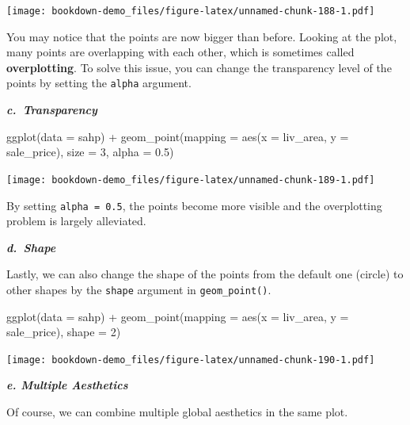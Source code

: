 \documentclass[
]{book}
\newenvironment{Shaded}{\begin{snugshade}}{\end{snugshade}}
\newcommand{\AttributeTok}[1]{\textcolor[rgb]{0.77,0.63,0.00}{#1}}
\newcommand{\DecValTok}[1]{\textcolor[rgb]{0.00,0.00,0.81}{#1}}
\newcommand{\FloatTok}[1]{\textcolor[rgb]{0.00,0.00,0.81}{#1}}
\newcommand{\FunctionTok}[1]{\textcolor[rgb]{0.00,0.00,0.00}{#1}}
\newcommand{\NormalTok}[1]{#1}
\newcommand{\SpecialCharTok}[1]{\textcolor[rgb]{0.00,0.00,0.00}{#1}}
\begin{document}
\texttt{[image: bookdown-demo\_files/figure-latex/unnamed-chunk-188-1.pdf]}

You may notice that the points are now bigger than before. Looking at the plot, many points are overlapping with each other, which is sometimes called \textbf{overplotting}. To solve this issue, you can change the transparency level of the points by setting the \texttt{alpha} argument.

\textbf{\emph{c.~Transparency}}

\begin{Shaded}
\begin{Highlighting}[]
\FunctionTok{ggplot}\NormalTok{(}\AttributeTok{data =}\NormalTok{ sahp) }\SpecialCharTok{+} \FunctionTok{geom\_point}\NormalTok{(}\AttributeTok{mapping =} \FunctionTok{aes}\NormalTok{(}\AttributeTok{x =}\NormalTok{ liv\_area, }\AttributeTok{y =}\NormalTok{ sale\_price), }\AttributeTok{size =} \DecValTok{3}\NormalTok{, }\AttributeTok{alpha =} \FloatTok{0.5}\NormalTok{)}
\end{Highlighting}
\end{Shaded}

\texttt{[image: bookdown-demo\_files/figure-latex/unnamed-chunk-189-1.pdf]}

By setting \texttt{alpha\ =\ 0.5}, the points become more visible and the overplotting problem is largely alleviated.

\textbf{\emph{d.~Shape}}

Lastly, we can also change the shape of the points from the default one (circle) to other shapes by the \texttt{shape} argument in \texttt{geom\_point()}.

\begin{Shaded}
\begin{Highlighting}[]
\FunctionTok{ggplot}\NormalTok{(}\AttributeTok{data =}\NormalTok{ sahp) }\SpecialCharTok{+} \FunctionTok{geom\_point}\NormalTok{(}\AttributeTok{mapping =} \FunctionTok{aes}\NormalTok{(}\AttributeTok{x =}\NormalTok{ liv\_area, }\AttributeTok{y =}\NormalTok{ sale\_price), }\AttributeTok{shape =} \DecValTok{2}\NormalTok{)}
\end{Highlighting}
\end{Shaded}

\texttt{[image: bookdown-demo\_files/figure-latex/unnamed-chunk-190-1.pdf]}

\textbf{\emph{e. Multiple Aesthetics}}

Of course, we can combine multiple global aesthetics in the same plot.
\end{document}
